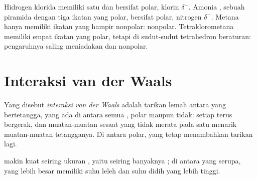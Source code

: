 \begin{example}\label{ex:g11:polarity-and-cohesion:four}
Hidrogen klorida  memiliki satu  dan bersifat polar,
klorin $\delta^-$. Amonia , sebuah piramida dengan tiga ikatan
 yang polar, bersifat polar, nitrogen $\delta^-$. Metana
 hanya memiliki ikatan  yang hampir nonpolar: nonpolar.
Tetraklorometana  memiliki empat ikatan  yang polar,
tetapi di sudut-sudut tetrahedron beraturan: pengaruhnya saling
meniadakan dan  nonpolar.
\end{example}

\section{Interaksi van der Waals}

\begin{definition}\label{def:g11:polarity-and-cohesion:van-der-waals}
Yang disebut \emph{interaksi van der Waals}
adalah tarikan lemah antara  yang bertetangga, yang ada
di antara semua , polar maupun tidak:  setiap
 terus bergerak, dan muatan-muatan sesaat yang tidak merata pada
satu  menarik muatan-muatan  tetangganya. Di antara
 polar,  yang tetap menambahkan tarikan
lagi.
\end{definition}


\begin{proposition}\label{prop:g11:polarity-and-cohesion:size}
 makin kuat seiring ukuran , yaitu seiring
banyaknya ; di antara  yang serupa, yang lebih
besar memiliki suhu leleh dan suhu didih yang lebih tinggi.
\end{proposition}


